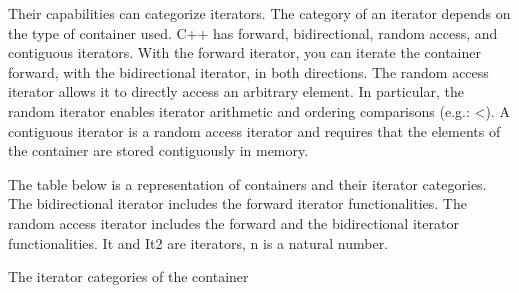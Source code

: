 Their capabilities can categorize iterators. The category of an iterator depends on the type of container used. C++ has forward, bidirectional, random access, and contiguous iterators. With the forward iterator, you can iterate the container forward, with the bidirectional iterator, in both directions. The random access iterator allows it to directly access an arbitrary element. In particular, the random iterator enables iterator arithmetic and ordering comparisons (e.g.: <). A contiguous iterator is a random access iterator and requires that the elements of the container are stored contiguously in memory.

The table below is a representation of containers and their iterator categories. The bidirectional iterator includes the forward iterator functionalities. The random access iterator includes the forward and the bidirectional iterator functionalities. It and It2 are iterators, n is a natural number.

\begin{center}
The iterator categories of the container
\end{center}

